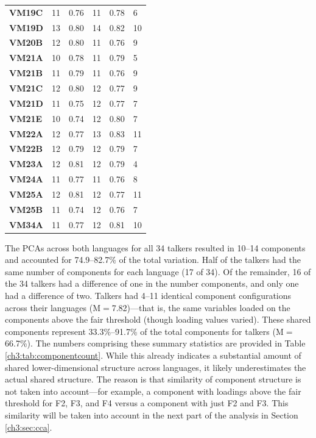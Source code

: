 \begin{table}[ptbh]
{\begin{tabular}{llllll}
    \textbf{VM19C} & 11 & 0.76 & 11 & 0.78 & 6 \\
    \textbf{VM19D} & 13 & 0.80 & 14 & 0.82 & 10 \\
    \textbf{VM20B} & 12 & 0.80 & 11 & 0.76 & 9 \\
    \textbf{VM21A} & 10 & 0.78 & 11 & 0.79 & 5 \\
    \textbf{VM21B} & 11 & 0.79 & 11 & 0.76 & 9 \\
    \textbf{VM21C} & 12 & 0.80 & 12 & 0.77 & 9 \\
    \textbf{VM21D} & 11 & 0.75 & 12 & 0.77 & 7 \\
    \textbf{VM21E} & 10 & 0.74 & 12 & 0.80 & 7 \\
    \textbf{VM22A} & 12 & 0.77 & 13 & 0.83 & 11 \\
    \textbf{VM22B} & 12 & 0.79 & 12 & 0.79 & 7 \\
    \textbf{VM23A} & 12 & 0.81 & 12 & 0.79 & 4 \\
    \textbf{VM24A} & 11 & 0.77 & 11 & 0.76 & 8 \\
    \textbf{VM25A} & 12 & 0.81 & 12 & 0.77 & 11 \\
    \textbf{VM25B} & 11 & 0.74 & 12 & 0.76 & 7 \\
    \textbf{VM34A} & 11 & 0.77 & 12 & 0.81 & 10 \\
    \bottomrule
    \end{tabular}
}
\end{table}

The PCAs across both languages for all 34 talkers resulted in 10--14 components and accounted for 74.9--82.7\% of the total variation. Half of the talkers had the same number of components for each language (17 of 34). Of the remainder, 16 of the 34 talkers had a difference of one in the number components, and only one had a difference of two. Talkers had 4--11 identical component configurations across their languages (M$=$7.82)---that is, the same variables loaded on the components above the fair threshold (though loading values varied). These shared components represent 33.3\%--91.7\% of the total components for talkers (M$=$66.7\%). The numbers comprising these summary statistics are provided in Table \ref{ch3:tab:componentcount}. While this already indicates a substantial amount of shared lower-dimensional structure across languages, it likely underestimates the actual shared structure. The reason is that similarity of component structure is not taken into account---for example, a component with loadings above the fair threshold for F2, F3, and F4 versus a component with just F2 and F3. This similarity will be taken into account in the next part of the analysis in Section \ref{ch3:sec:cca}. 


